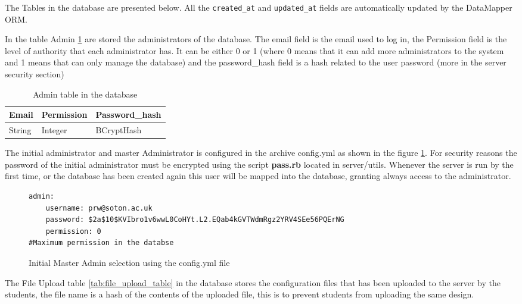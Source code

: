 The Tables in the database are presented below. All the \texttt{created\_at} and \texttt{updated\_at} fields
are automatically updated by the DataMapper ORM.

 In the table Admin \ref{tab:admin_table} are stored the administrators of the database. The email field is the email used to log in,
the Permission field is the level of authority that each administrator has. It can be either 0 or 1 (where 0 means that it can add
more administrators to the system and 1 means that can only manage the database) and the password\_hash field is a hash related to the user password (more in the server security section)

\begin{table}[h!]
\centering
    \begin{tabular}{ | l | l | l |}
    \hline
    Email & Permission & Password\_hash  \\ \hline
    String & Integer & BCryptHash \\ \hline
    \end{tabular}
    \caption{Admin table in the database}
    \label{tab:admin_table}
\end{table}

The initial administrator and master Administrator is configured in the archive config.yml as shown in the figure \ref{fig:admin_config}. For security reasons the password of
the initial administrator must be encrypted using the script {\bf pass.rb} located in server/utils. Whenever the server is run by the first time, or the database
has been created again this user will be mapped into the database, granting always access to the administrator.

\begin{figure}[htb]
\centering
\lstset{basicstyle=\scriptsize\ttfamily}
\begin{lstlisting}
admin:
    username: prw@soton.ac.uk
    password: $2a$10$KVIbro1v6wwL0CoHYt.L2.EQab4kGVTWdmRgz2YRV4SEe56PQErNG
    permission: 0
#Maximum permission in the databse
\end{lstlisting}
\caption{Initial Master Admin selection using the config.yml file}
\label{fig:admin_config}
\end{figure}

The File Upload table \ref{tab:file_upload_table} in the database stores the configuration files that has been uploaded to the server by the students, the file name is a hash of the contents of the uploaded file,
this is to prevent students from uploading the same design.

